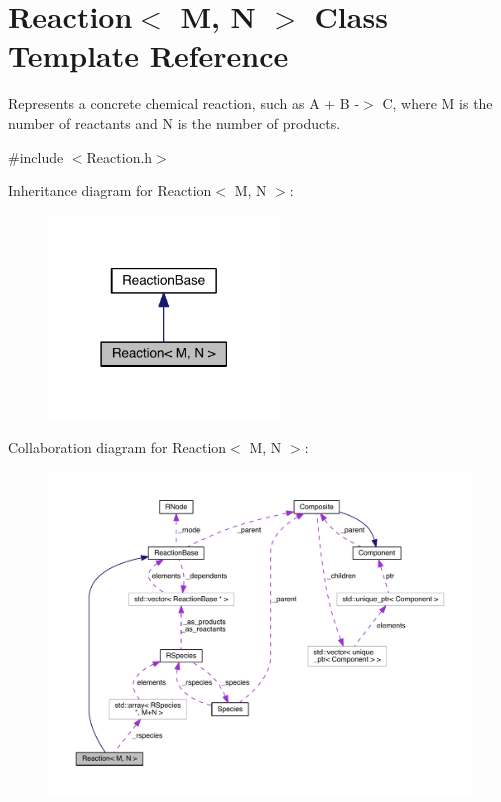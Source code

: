 \hypertarget{classReaction}{\section{Reaction$<$ M, N $>$ Class Template Reference}
\label{classReaction}
}


Represents a concrete chemical reaction, such as A + B -\/$>$ C, where M is the number of reactants and N is the number of products.  




{\ttfamily \#include $<$Reaction.\+h$>$}



Inheritance diagram for Reaction$<$ M, N $>$\+:
\nopagebreak
\begin{figure}[H]
\begin{center}
\leavevmode
\includegraphics[width=174pt]{classReaction__inherit__graph}
\end{center}
\end{figure}


Collaboration diagram for Reaction$<$ M, N $>$\+:
\nopagebreak
\begin{figure}[H]
\begin{center}
\leavevmode
\includegraphics[width=350pt]{classReaction__coll__graph}
\end{center}
\end{figure}
